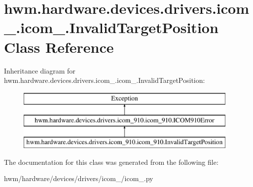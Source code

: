 \hypertarget{classhwm_1_1hardware_1_1devices_1_1drivers_1_1icom__910_1_1icom__910_1_1_invalid_target_position}{\section{hwm.\-hardware.\-devices.\-drivers.\-icom\-\_.\-icom\-\_.\-Invalid\-Target\-Position Class Reference}
\label{classhwm_1_1hardware_1_1devices_1_1drivers_1_1icom__910_1_1icom__910_1_1_invalid_target_position}
}
Inheritance diagram for hwm.\-hardware.\-devices.\-drivers.\-icom\-\_.\-icom\-\_.\-Invalid\-Target\-Position\-:\begin{figure}[H]
\begin{center}
\leavevmode
\includegraphics[height=3.000000cm]{classhwm_1_1hardware_1_1devices_1_1drivers_1_1icom__910_1_1icom__910_1_1_invalid_target_position}
\end{center}
\end{figure}


The documentation for this class was generated from the following file\-:\begin{DoxyCompactItemize}
\item 
hwm/hardware/devices/drivers/icom\-\_/icom\-\_.\-py\end{DoxyCompactItemize}
